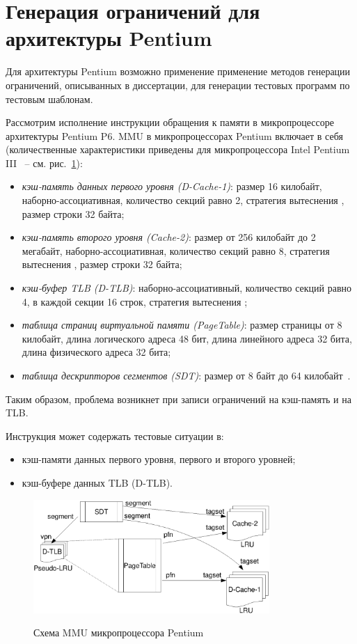 \section{Генерация ограничений для архитектуры Pentium}

\begin{utv}
Для архитектуры Pentium возможно применение применение методов
генерации ограничений, описыванных в диссертации, для генерации
тестовых программ по тестовым шаблонам.
\end{utv}

Рассмотрим исполнение инструкции обращения к памяти в
микропроцессоре архитектуры Pentium P6. MMU в микропроцессорах
Pentium включает в себя (количественные характеристики приведены для
микропроцессора Intel Pentium III~\cite{HennessyPatterson3rd} -- см.
рис.~\ref{p6_mmu_scheme}):
\begin{itemize}
  \item \emph{кэш-память данных первого уровня (D-Cache-1)}: размер
  16 килобайт, наборно-ассоциативная, количество секций равно 2,
  стратегия вытеснения \LRU, размер строки 32 байта;
  \item \emph{кэш-память второго уровня (Cache-2)}: размер от 256 килобайт
  до 2 мегабайт, наборно-ассоциативная, количество секций равно 8, стратегия
  вытеснения \LRU, размер строки 32 байта;
  \item \emph{кэш-буфер TLB (D-TLB)}: наборно-ассоциативный,
  количество секций равно 4, в каждой секции 16 строк, стратегия вытеснения
  \PseudoLRU;
  \item \emph{таблица страниц виртуальной памяти (PageTable)}:
  размер страницы от 8 килобайт, длина логического адреса 48 бит,
  длина линейного адреса 32 бита, длина физического адреса 32 бита;
  \item \emph{таблица дескрипторов сегментов (SDT)}: размер от 8 байт до 64
  килобайт~\cite{FundamentalOfComputerOrganizationAndDesign}.
\end{itemize}
Таким образом, проблема возникнет при записи ограничений на
кэш-память и на TLB.

Инструкция может содержать тестовые ситуации в:
\begin{itemize}
  \item кэш-памяти данных первого уровня, первого и второго уровней;
  \item кэш-буфере данных TLB (D-TLB).
\end{itemize}

\begin{figure}[h] \center
  \includegraphics[width=0.8\textwidth]{4.analysis/p6}\\
  \caption{Схема MMU микропроцессора Pentium}\label{p6_mmu_scheme}
\end{figure}

